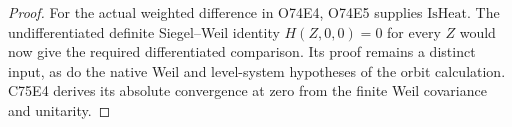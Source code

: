 \begin{proof}
For the actual weighted difference in O74E4, O74E5 supplies
$\mathrm{IsHeat}$. The undifferentiated definite Siegel--Weil
identity $H(Z,0,0)=0$ for every $Z$ would now give the required
differentiated comparison. Its proof remains a distinct input,
as do the native Weil and level-system hypotheses of the orbit
calculation. C75E4 derives its absolute convergence at zero from
the finite Weil covariance and unitarity.
\end{proof}

